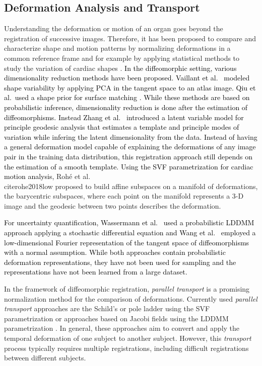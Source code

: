 \documentclass[journal]{IEEEtran}
\newcommand{\update}[1]{\textcolor{black}{#1}}
\begin{document}
\subsection{Deformation Analysis and Transport}
Understanding the deformation or motion of an organ goes beyond the registration of successive images. Therefore, it has been proposed to compare and characterize shape and motion patterns by normalizing deformations in a common reference frame \cite{lorenzi2014efficient,duchateau2011spatiotemporal} and for example by applying statistical methods to study the variation of cardiac shapes \cite{bai2015bi}. \update{In the diffeomorphic setting, various dimensionality reduction methods have been proposed. Vaillant et al.\ \cite{vaillant2004statistics} modeled shape variability by applying PCA in the tangent space to an atlas image. Qiu et al.\ used a shape prior for surface matching \cite{qiu2012principal}. While these methods are based on probabilistic inference, dimensionality reduction is done after the estimation of diffeomorphisms. Instead Zhang et al.\ \cite{zhang2014bayesian} introduced a latent variable model for principle geodesic analysis that estimates a template and principle modes of variation while infering the latent dimensionality from the data. Instead of having a general deformation model capable of explaining the deformations of any image pair in the training data distribution, this registration approach still depends on the estimation of a smooth template. Using the SVF parametrization for cardiac motion analysis,} Roh\'e et al.\\cite{rohe2018low} proposed to build affine subspaces on a manifold of deformations, the barycentric subspaces, where each point on the manifold represents a 3-D image and the geodesic between two points describes the deformation.

\update{For uncertainty quantification, Wassermann et al.~\cite{wassermann2014probabilistic} used a probabilistic LDDMM approach applying a stochastic differential equation and Wang et al.~\cite{wang2018efficient} employed a low-dimensional Fourier representation of the tangent space of diffeomorphisms with a normal assumption. While both approaches contain probabilistic deformation representations, they have not been used for sampling and the representations have not been learned from a large dataset.}

In the framework of diffeomorphic registration, \emph{parallel transport} is a promising normalization method for the comparison of deformations.  Currently used \emph{parallel transport} approaches are the Schild's \cite{lorenzi2011schild} or pole ladder \cite{lorenzi2014efficient,jia2018parallel} using the SVF parametrization or approaches based on Jacobi fields using the LDDMM parametrization \cite{younes2007jacobi,louis2017parallel}. In general, these approaches aim to convert and apply the temporal deformation of one subject to another subject. However, this \emph{transport} process typically requires multiple registrations, including difficult registrations between different subjects. 
\end{document}
